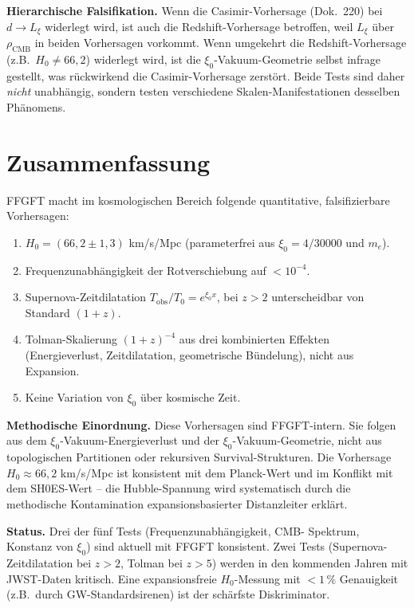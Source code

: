 \textbf{Hierarchische Falsifikation.} Wenn die Casimir-Vorhersage
(Dok.~220) bei $d \to L_\xi$ widerlegt wird, ist auch die
Redshift-Vorhersage betroffen, weil $L_\xi$ über $\rho_\text{CMB}$ in
beiden Vorhersagen vorkommt. Wenn umgekehrt die Redshift-Vorhersage
(z.B.\ $H_0 \neq 66{,}2$) widerlegt wird, ist die
$\xi_0$-Vakuum-Geometrie selbst infrage gestellt, was rückwirkend
die Casimir-Vorhersage zerstört. Beide Tests sind daher \emph{nicht}
unabhängig, sondern testen verschiedene Skalen-Manifestationen
desselben Phänomens.

\section{Zusammenfassung}

FFGFT macht im kosmologischen Bereich folgende quantitative,
falsifizierbare Vorhersagen:

\begin{enumerate}[leftmargin=2em,itemsep=2pt,topsep=2pt]
  \item $H_0 = (66{,}2 \pm 1{,}3)$ km/s/Mpc
        (parameterfrei aus $\xi_0 = 4/30000$ und $m_e$).
  \item Frequenzunabhängigkeit der Rotverschiebung auf $< 10^{-4}$.
  \item Supernova-Zeitdilatation $T_{\text{obs}}/T_0 = e^{\xi_0 x}$,
        bei $z > 2$ unterscheidbar von Standard $(1+z)$.
  \item Tolman-Skalierung $(1+z)^{-4}$ aus drei kombinierten
        Effekten (Energieverlust, Zeitdilatation, geometrische
        Bündelung), nicht aus Expansion.
  \item Keine Variation von $\xi_0$ über kosmische Zeit.
\end{enumerate}

\textbf{Methodische Einordnung.} Diese Vorhersagen sind FFGFT-intern.
Sie folgen aus dem $\xi_0$-Vakuum-Energieverlust und der
$\xi_0$-Vakuum-Geometrie, nicht aus topologischen Partitionen oder
rekursiven Survival-Strukturen. Die Vorhersage $H_0 \approx 66{,}2$
km/s/Mpc ist konsistent mit dem Planck-Wert und im Konflikt mit dem
SH0ES-Wert -- die Hubble-Spannung wird systematisch durch die
methodische Kontamination expansionsbasierter Distanzleiter erklärt.

\textbf{Status.} Drei der fünf Tests (Frequenzunabhängigkeit, CMB-
Spektrum, Konstanz von $\xi_0$) sind aktuell mit FFGFT konsistent.
Zwei Tests (Supernova-Zeitdilatation bei $z > 2$, Tolman bei $z > 5$)
werden in den kommenden Jahren mit JWST-Daten kritisch. Eine
expansionsfreie $H_0$-Messung mit $< 1\,\%$ Genauigkeit (z.B.\
durch GW-Standardsirenen) ist der schärfste Diskriminator.
